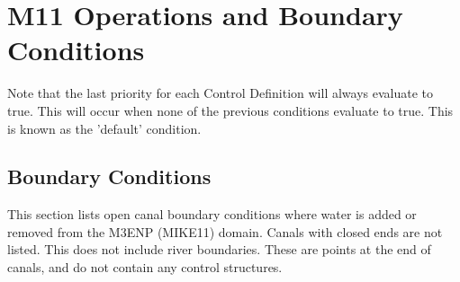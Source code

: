 \section{M11 Operations and Boundary Conditions}

\normalsize
Note that the last priority for each Control Definition will always evaluate to true. This will occur when none of the previous conditions evaluate to true. This is known as the 'default' condition.


\clearpage
\subsection{Boundary Conditions}

This section lists open canal boundary conditions where water is added or removed from the M3ENP (MIKE11) domain. Canals with closed ends are not listed. This does not include river boundaries. These are points at the end of canals, and do not contain any control structures.

